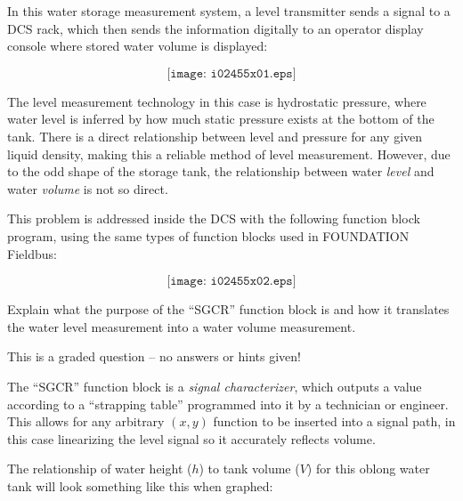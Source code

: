 

In this water storage measurement system, a level transmitter sends a signal to a DCS rack, which then sends the information digitally to an operator display console where stored water volume is displayed:

$$\texttt{[image: i02455x01.eps]}$$

The level measurement technology in this case is hydrostatic pressure, where water level is inferred by how much static pressure exists at the bottom of the tank.  There is a direct relationship between level and pressure for any given liquid density, making this a reliable method of level measurement.  However, due to the odd shape of the storage tank, the relationship between water {\it level} and water {\it volume} is not so direct.

This problem is addressed inside the DCS with the following function block program, using the same types of function blocks used in FOUNDATION Fieldbus:

$$\texttt{[image: i02455x02.eps]}$$

Explain what the purpose of the ``SGCR'' function block is and how it translates the water level measurement into a water volume measurement.

\vfil

\eject






This is a graded question -- no answers or hints given!







The ``SGCR'' function block is a {\it signal characterizer}, which outputs a value according to a ``strapping table'' programmed into it by a technician or engineer.  This allows for any arbitrary $(x,y)$ function to be inserted into a signal path, in this case linearizing the level signal so it accurately reflects volume.

\vskip 10pt

The relationship of water height ($h$) to tank volume ($V$) for this oblong water tank will look something like this when graphed:

